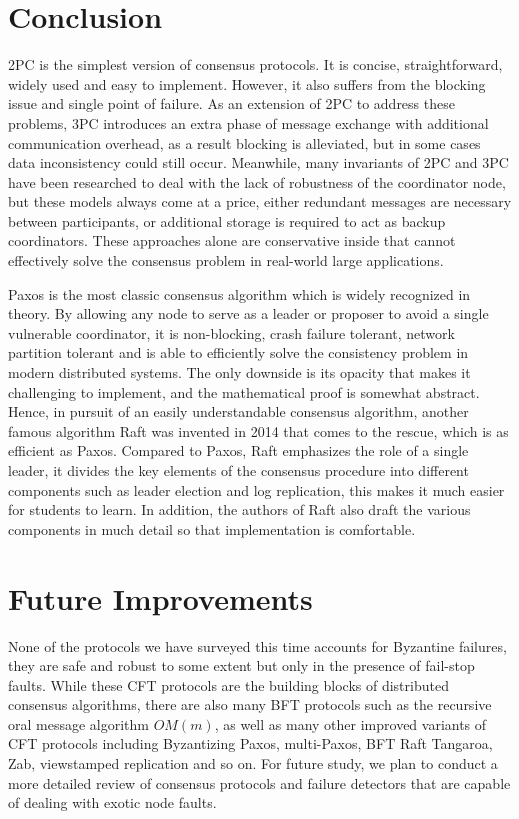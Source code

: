 \documentclass[11pt]{article}
\begin{document}
  \section{Conclusion}
    \small{2PC} \normalsize is the simplest version of consensus protocols. It is concise, straightforward, widely used and easy to implement. However, it also suffers from the blocking issue and single point of failure. As an extension of \small{2PC} \normalsize to address these problems, \small{3PC} \normalsize introduces an extra phase of message exchange with additional communication overhead, as a result blocking is alleviated, but in some cases data inconsistency could still occur. Meanwhile, many invariants of \small{2PC} \normalsize and \small{3PC} \normalsize have been researched to deal with the lack of robustness of the coordinator node, but these models always come at a price, either redundant messages are necessary between participants, or additional storage is required to act as backup coordinators. These approaches alone are conservative inside that cannot effectively solve the consensus problem in real-world large applications.

    Paxos is the most classic consensus algorithm which is widely recognized in theory. By allowing any node to serve as a leader or proposer to avoid a single vulnerable coordinator, it is non-blocking, crash failure tolerant, network partition tolerant and is able to efficiently solve the consistency problem in modern distributed systems. The only downside is its opacity that makes it challenging to implement, and the mathematical proof is somewhat abstract. Hence, in pursuit of an easily understandable consensus algorithm, another famous algorithm Raft was invented in 2014 that comes to the rescue, which is as efficient as Paxos. Compared to Paxos, Raft emphasizes the role of a single leader, it divides the key elements of the consensus procedure into different components such as leader election and log replication, this makes it much easier for students to learn. In addition, the authors of Raft also draft the various components in much detail so that implementation is comfortable.

  \section{Future Improvements}
    None of the protocols we have surveyed this time accounts for Byzantine failures, they are safe and robust to some extent but only in the presence of fail-stop faults. While these \small{CFT} \normalsize protocols are the building blocks of distributed consensus algorithms, there are also many \small{BFT} \normalsize protocols such as the recursive oral message algorithm $OM(m)$\autocite{bft}, as well as many other improved variants of \small{CFT} \normalsize protocols including Byzantizing Paxos, multi-Paxos, \small{BFT} \normalsize Raft Tangaroa, Zab, viewstamped replication and so on. For future study, we plan to conduct a more detailed review of consensus protocols and failure detectors that are capable of dealing with exotic node faults.


  \vspace{8mm}
  \printbibliography

  \vfill
  \doclicenseThis
\end{document}

